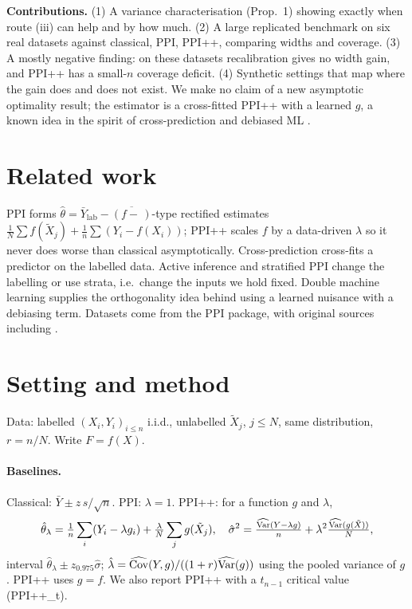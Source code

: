 \documentclass{article}
\begin{document}
\textbf{Contributions.} (1) A variance characterisation (Prop.~1) showing exactly when route (iii) can help and by how much. (2) A large replicated benchmark on six real datasets against classical, PPI, PPI++, comparing widths and coverage. (3) A mostly negative finding: on these datasets recalibration gives no width gain, and PPI++ has a small-$n$ coverage deficit. (4) Synthetic settings that map where the gain does and does not exist. We make no claim of a new asymptotic optimality result; the estimator is a cross-fitted PPI++ with a learned $g$, a known idea in the spirit of cross-prediction and debiased ML \citep{crossppi,dml}.

\section{Related work}
PPI \citep{ppi} forms $\hat\theta=\bar Y_{\text{lab}}-\overline{(f-\,)}$-type rectified estimates $\frac1N\sum f(\tilde X_j)+\frac1n\sum (Y_i-f(X_i))$; PPI++ \citep{ppipp} scales $f$ by a data-driven $\lambda$ so it never does worse than classical asymptotically. Cross-prediction \citep{crossppi} cross-fits a predictor on the labelled data. Active inference \citep{active} and stratified PPI \citep{stratppi} change the labelling or use strata, i.e.\ change the inputs we hold fixed. Double machine learning \citep{dml} supplies the orthogonality idea behind using a learned nuisance with a debiasing term. Datasets come from the PPI package, with original sources including \citet{galaxy}.

\section{Setting and method}
Data: labelled $(X_i,Y_i)_{i\le n}$ i.i.d., unlabelled $\tilde X_j$, $j\le N$, same distribution, $r=n/N$. Write $F=f(X)$.
\paragraph{Baselines.} Classical: $\bar Y\pm z\,s/\sqrt n$. PPI: $\lambda=1$. PPI++: for a function $g$ and $\lambda$,
\[\hat\theta_\lambda=\tfrac1n\sum_i (Y_i-\lambda g_i)+\tfrac{\lambda}{N}\sum_j g(\tilde X_j),\quad \hat\sigma^2=\tfrac{\widehat{\operatorname{Var}}(Y-\lambda g)}{n}+\lambda^2\tfrac{\widehat{\operatorname{Var}}(g(\tilde X))}{N},\]
interval $\hat\theta_\lambda\pm z_{0.975}\hat\sigma$; $\hat\lambda=\widehat{\operatorname{Cov}}(Y,g)/((1+r)\widehat{\operatorname{Var}}(g))$ using the pooled variance of $g$. PPI++ uses $g=f$. We also report PPI++ with a $t_{n-1}$ critical value (PPI++\_t).
\end{document}

